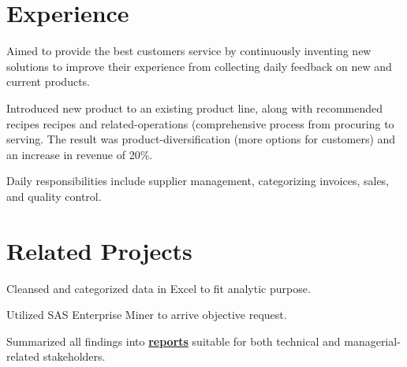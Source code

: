 \documentclass[letterpaper]{deedy-resume} %
\begin{document}
\begin{minipage}[t]{0.66\textwidth} %


\section{Experience}
\vspace{\topsep} %
\begin{tightitemize}
\item Aimed to provide the best customers service by continuously inventing new solutions to improve their experience from collecting daily feedback on new and current products.
\item Introduced new product to an existing product line, along with recommended recipes recipes and related-operations (comprehensive process from procuring to serving. The result was product-diversification (more options for customers) and an increase in revenue of 20\%.
\item Daily responsibilities include supplier management, categorizing invoices, sales, and quality control.
\end{tightitemize}
\sectionspace %




\section{Related Projects}

\begin{tightitemize}
\item Cleansed and categorized data in Excel to fit analytic purpose.
\item Utilized SAS Enterprise Miner to arrive objective request.
\item Summarized all findings into \href{https://drive.google.com/file/d/0B7mZbJb-qiSUWnc4b3dWMGVZT2M/view?usp=sharing}{\bf reports} suitable for both technical and managerial-related stakeholders.
\end{tightitemize}


\end{minipage}
\end{document}

